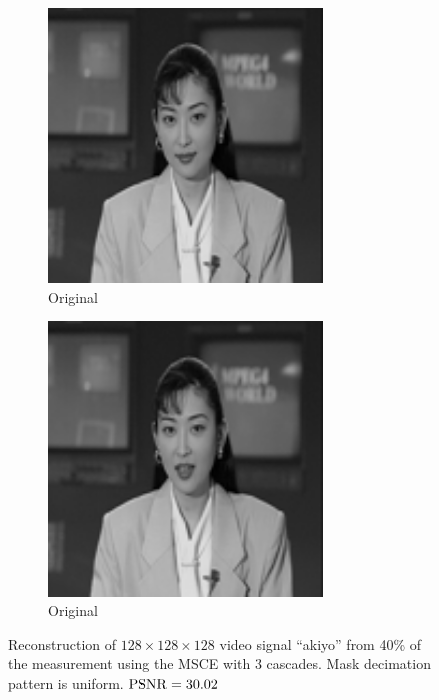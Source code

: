 \begin{figure}[!ht]
\begin{subfigure}{0.4\textwidth}
    \centering
    \includegraphics[width=0.8\textwidth]{Chapter7/Images/akiyo40_orig_2.png}
    \caption{Original}
  \end{subfigure}
  \begin{subfigure}{0.4\textwidth}
    \centering
    \includegraphics[width=0.8\textwidth]{Chapter7/Images/akiyo40_orig_19.png}
    \caption{Original}
  \end{subfigure}
  \caption{Reconstruction of $128\times 128\times 128$ video signal ``akiyo'' from 40\% of the measurement using the MSCE with 3 cascades. Mask decimation pattern is uniform. $\operatorname*{PSNR} = 30.02$}
\end{figure}

